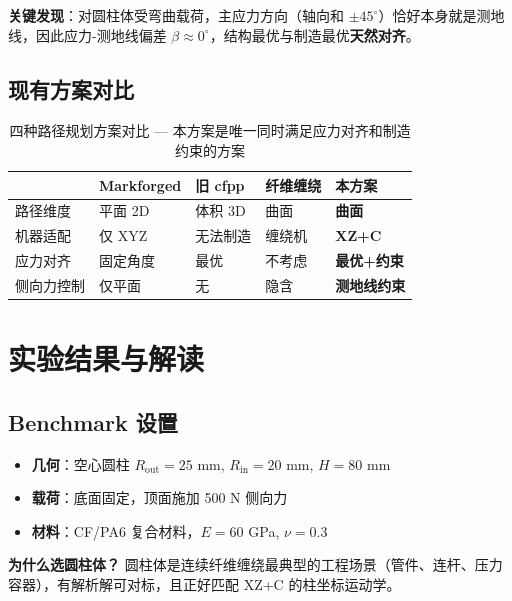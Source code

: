 \documentclass[11pt,a4paper]{article}
\begin{document}
\textbf{关键发现}：对圆柱体受弯曲载荷，主应力方向（轴向和 $\pm 45^\circ$）恰好本身就是测地线，因此应力-测地线偏差 $\beta \approx 0^\circ$，结构最优与制造最优\textbf{天然对齐}。

\subsection{现有方案对比}

\begin{table}[H]
\centering
\small
\begin{tabularx}{\textwidth}{l X X X X}
\toprule
& \textbf{Markforged} & \textbf{旧 cfpp} & \textbf{纤维缠绕} & \textcolor{accent}{\textbf{本方案}} \\
\midrule
路径维度 & 平面 2D & 体积 3D & 曲面 & \textcolor{pass}{\textbf{曲面}} \\
机器适配 & 仅 XYZ & 无法制造 & 缠绕机 & \textcolor{pass}{\textbf{XZ+C}} \\
应力对齐 & 固定角度 & 最优 & 不考虑 & \textcolor{pass}{\textbf{最优+约束}} \\
侧向力控制 & 仅平面 & 无 & 隐含 & \textcolor{pass}{\textbf{测地线约束}} \\
\bottomrule
\end{tabularx}
\caption{四种路径规划方案对比 --- 本方案是唯一同时满足应力对齐和制造约束的方案}
\label{tab:comparison}
\end{table}

\section{实验结果与解读}

\subsection{Benchmark 设置}

\begin{itemize}[nosep]
\item \textbf{几何}：空心圆柱 $R_{\text{out}} = 25$ mm, $R_{\text{in}} = 20$ mm, $H = 80$ mm
\item \textbf{载荷}：底面固定，顶面施加 500 N 侧向力
\item \textbf{材料}：CF/PA6 复合材料，$E = 60$ GPa, $\nu = 0.3$
\end{itemize}

\textbf{为什么选圆柱体？} 圆柱体是连续纤维缠绕最典型的工程场景（管件、连杆、压力容器），有解析解可对标，且正好匹配 XZ+C 的柱坐标运动学。
\end{document}
